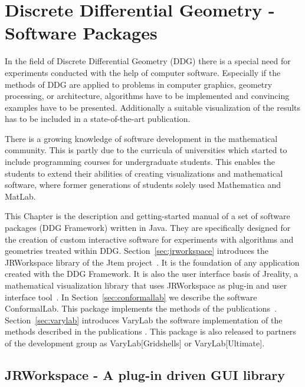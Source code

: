 \chapter{Discrete Differential Geometry - Software Packages}

In the field of Discrete Differential Geometry (DDG) there is a special need for experiments
conducted with the help of computer software. Especially if the methods of DDG are applied
to problems in computer graphics, geometry processing, or architecture, algorithms have 
to be implemented and convincing examples have to be presented. Additionally a suitable 
visualization of the results has to be included in a state-of-the-art publication.

There is a growing knowledge of software development in the mathematical community. This 
is partly due to the curricula of universities which started to include programming courses for undergraduate students.
This enables the students to extend their abilities of creating visualizations and mathematical software, where former generations of students solely used Mathematica and MatLab.

This Chapter is the description and getting-started manual of a set of software packages
(DDG Framework) written in Java. They are specifically designed for the creation of custom interactive software
for experiments with algorithms and geometries treated within DDG. 
Section~\ref{sec:jrworkspace} introduces the {\sc JRWorkspace} library of the {\sc Jtem} project~\cite{JtemWebsite}.
It is the foundation of any application created with the DDG Framework. It is also the user interface basis of {\sc Jreality}, a mathematical visualization library that uses {\sc JRWorkspace} as plug-in and user interface tool~\cite{JrealityWebsite}. In Section~\ref{sec:conformallab} we describe the software {\sc ConformalLab}. This package
implements the methods of the publications~\cite{Bobenko2010, OWR2012, Sechelmann2012, BobSechSpr}.
Section~\ref{sec:varylab} introduces {\sc VaryLab} the software implementation of the methods described in the publications \cite{Lafuente2011, Lafuente2012, Sechelmann2012}.
This package is also released to partners of the development group as {\sc VaryLab[Gridshells]} or {\sc VaryLab[Ultimate]}.


\section{{\sc JRWorkspace} - A plug-in driven GUI library}

